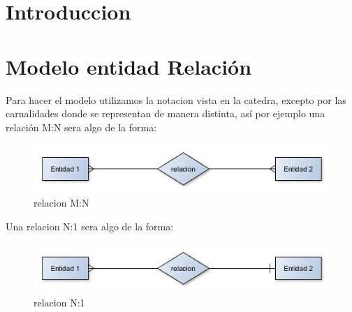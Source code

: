 \documentclass[10pt, a4paper]{article}
\author{Base de Datos, DC, UBA.}
\date{}
\title{}
\begin{document}
\thispagestyle{empty}
\titulo{}
\maketitle

\tableofcontents

\NoCaptionOfAlgo
\DontPrintSemicolon
\SetAlFnt{\ttfamily}

\newpage

\section{Introduccion}

	
 
\section{Modelo entidad Relaci\'on}

Para hacer el modelo utilizamos la notacion vista en la catedra, excepto por las carnalidades donde se representan de manera distinta, as\'i por ejemplo una relaci\'on M:N sera algo de la forma:

\begin{figure}[ht]
  \begin{center}
    \includegraphics[scale=.75]{./imagenes/ejrelacion.jpg}
    \caption{relacion M:N} 
    \label{fig:graficomn}
  \end{center}
\end{figure}

Una relacion N:1 sera algo de la forma:

\begin{figure}[ht]
  \begin{center}
    \includegraphics[scale=.75]{./imagenes/ejrelacion2.jpg}
    \caption{relacion N:1} 
    \label{fig:grafico}
  \end{center}
\end{figure}
\end{document}
